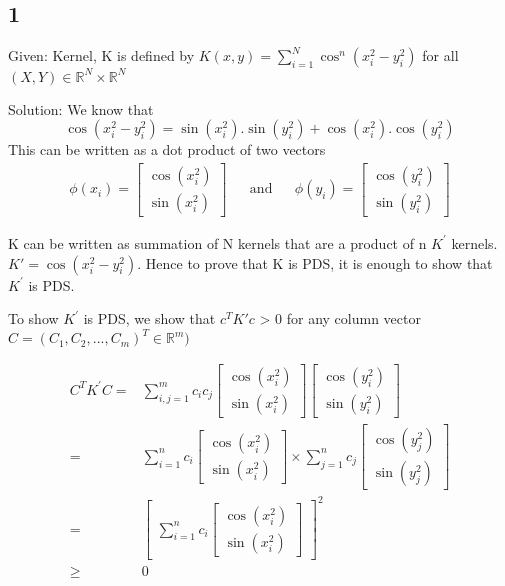 \documentclass{article}
\begin{document}
\subsection*{1}
\begin{description}
  \item{Given:} Kernel, K is defined by \(K(x,y) = \sum_{i=1}^{N} \cos^{n} (x_{i}^{2} - y_{i}^{2} )\) for all \((X, Y) \in \mathbb{R}^{N} \times \mathbb{R}^{N} \) 
  \item{Solution:}  We know that
    \begin{equation}
      \cos (x_{i}^{2} - y_{i}^{2}) = \sin (x_{i}^{2}).\sin (y_{i}^{2}) + \cos (x_{i}^{2}).\cos (y_{i}^{2})
    \end{equation}
    This can be written as a dot product of two vectors 
    \begin{align}
    \phi(x_{i}) = \begin{bmatrix} \cos (x_{i}^{2}) \\ \sin (x_{i}^{2}) \end{bmatrix} && \mathrm{and} &&
    \phi(y_{i}) = \begin{bmatrix} \cos (y_{i}^{2}) \\ \sin (y_{i}^{2}) \end{bmatrix}
    \end{align}

    K can be written as summation of N kernels that are a product of n \( K^{'} \) kernels.  \( K' = \cos (x_{i}^{2} - y_{i}^{2} ) \).  Hence to prove that K is PDS, it is enough to show that \( K^{'} \) is PDS. 

    To show \( K^{'}\) is PDS, we show that \( c^{T}K'c \)  > 0 for any column vector \( C = (C_{1}, C_{2}, ...  ,C_{m})^{T} \in \mathbb{R}^{m} ) \)

    \begin{align}
    C^{T}K^{'}C  =& \sum_{i,j = 1}^{m} c_{i}c_{j} \begin{bmatrix} \cos (x_{i}^{2}) \\ \sin (x_{i}^{2}) \end{bmatrix} \begin{bmatrix} \cos (y_{i}^{2}) \\ \sin (y_{i}^{2}) \end{bmatrix} \\
      =& \sum_{i=1}^{n}c_{i} \begin{bmatrix} \cos (x_{i}^{2}) \\ \sin (x_{i}^{2}) \end{bmatrix} \times \sum_{j=1}^{n}c_{j} \begin{bmatrix} \cos (y_{j}^{2}) \\ \sin (y_{j}^{2}) \end{bmatrix}\\
    =& \begin{bmatrix} \sum_{i=1}^{n} c_{i} \begin{bmatrix} \cos (x_{i}^{2}) \\ \sin (x_{i}^{2})  \end{bmatrix} \end{bmatrix}^{2} \\
    \ge& 0
    \end{align}


\end{description}
\end{document}
